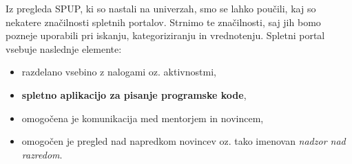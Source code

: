 Iz pregleda SPUP, ki so nastali na univerzah, smo se lahko poučili, kaj
so nekatere značilnosti spletnih portalov. Strnimo te značilnosti, saj
jih bomo pozneje uporabili pri iskanju, kategoriziranju in
vrednotenju. Spletni portal vsebuje naslednje elemente:

\begin{itemize}
\tightlist
\item razdelano vsebino z nalogami oz. aktivnostmi,
\item \textbf{spletno aplikacijo za pisanje programske kode},
\item omogočena je komunikacija med mentorjem in novincem,
\item omogočen je pregled nad napredkom novincev oz. tako imenovan
  \emph{nadzor nad razredom}.
\end{itemize}


